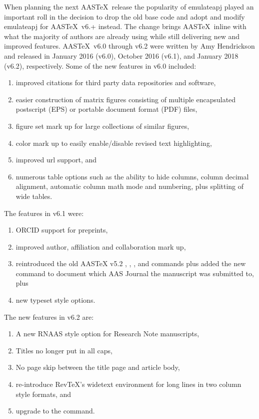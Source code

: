 \documentclass{aastex62}
\newcommand\aastex{AAS\TeX}
\begin{document}
When planning the next \aastex\ release the popularity of emulateapj played
an important roll in the decision to drop the old base code and adopt and
modify emulateapj for \aastex\ v6.+ instead.  The change brings \aastex\
inline with what the majority of authors are already using while still
delivering new and improved features.  \aastex\ v6.0 through v6.2 were written
by Amy Hendrickson and released in January 2016 (v6.0), October 2016 (v6.1),
and January 2018 (v6.2), respectively.  Some of the new features in v6.0 
included:

\begin{enumerate}
\item improved citations for third party data repositories and software,
\item easier construction of matrix figures consisting of multiple 
encapsulated postscript (EPS) or portable document format (PDF) files,
\item figure set mark up for large collections of similar figures,
\item color mark up to easily enable/disable revised text highlighting,
\item improved url support, and
\item numerous table options such as the ability to hide columns, column 
decimal alignment, automatic column math mode and numbering, plus splitting of
wide tables.
\end{enumerate}

The features in v6.1 were:

\begin{enumerate}
\item ORCID support for preprints,
\item improved author, affiliation and collaboration mark up,
\item reintroduced the old AASTeX v5.2 {\tt\string\received}, 
      {\tt\string\revised}, {\tt\string\accepted}, and
      {\tt\string\published} commands plus
      added the new {\tt\string\submitjournal} command to document
      which AAS Journal the manuscript was submitted to, plus
\item new typeset style options.
\end{enumerate}

The new features in v6.2 are:

\begin{enumerate}
\item A new RNAAS style option for Research Note manuscripts,
\item Titles no longer put in all caps,
\item No page skip between the title page and article body,
\item re-introduce RevTeX's widetext environment for long lines in
      two column style formats, and
\item upgrade to the {\tt\string\doi} command.
\end{enumerate}
\end{document}
